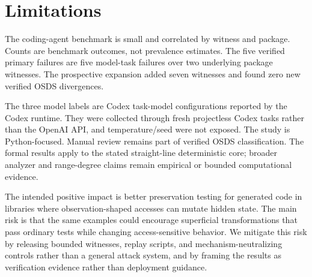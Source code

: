 \section{Limitations}

The coding-agent benchmark is small and correlated by witness and package. Counts are benchmark outcomes, not prevalence estimates. The five verified primary failures are five model-task failures over two underlying package witnesses. The prospective expansion added seven witnesses and found zero new verified OSDS divergences.

The three model labels are Codex task-model configurations reported by the Codex runtime. They were collected through fresh projectless Codex tasks rather than the OpenAI API, and temperature/seed were not exposed. The study is Python-focused. Manual review remains part of verified OSDS classification. The formal results apply to the stated straight-line deterministic core; broader analyzer and range-degree claims remain empirical or bounded computational evidence.

The intended positive impact is better preservation testing for generated code in libraries where observation-shaped accesses can mutate hidden state. The main risk is that the same examples could encourage superficial transformations that pass ordinary tests while changing access-sensitive behavior. We mitigate this risk by releasing bounded witnesses, replay scripts, and mechanism-neutralizing controls rather than a general attack system, and by framing the results as verification evidence rather than deployment guidance.
